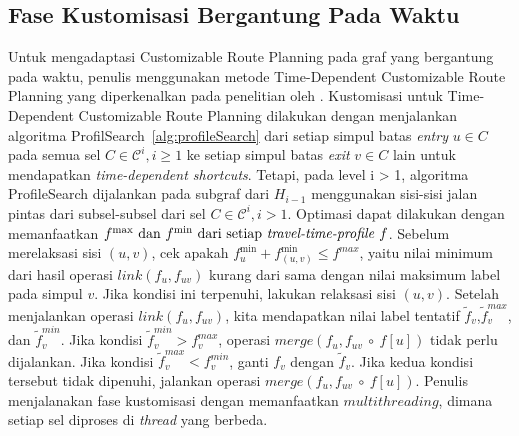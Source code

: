 \subsection{Fase Kustomisasi Bergantung Pada Waktu}
\label{subsec:tdcrp-timedependent-customization}
Untuk mengadaptasi Customizable Route Planning pada graf yang bergantung pada waktu, penulis menggunakan metode Time-Dependent Customizable Route Planning yang diperkenalkan pada penelitian oleh \cite{Baum2016}. Kustomisasi untuk Time-Dependent Customizable Route Planning dilakukan dengan menjalankan algoritma ProfilSearch~\ref{alg:profileSearch} dari setiap simpul batas \textit{entry} $u\in C$ pada semua sel $C\in\mathcal{C}^{i}, i\geq 1$ ke setiap simpul batas \textit{exit} $v\in C$ lain untuk mendapatkan \textit{time-dependent shortcuts}.  Tetapi, pada level i > 1, algoritma ProfileSearch dijalankan pada subgraf dari $H_{i-1}$ menggunakan sisi-sisi jalan pintas dari subsel-subsel dari sel $C\in\mathcal{C}^i, i>1$. Optimasi dapat dilakukan dengan memanfaatkan $f^{\max}\text{ dan }f^{\min} \text{ dari setiap \textit{travel-time-profile} } f $. Sebelum merelaksasi sisi $(u,v)$, cek apakah $f_{u}^{\min}+f_{(u,v)}^{\min}\leq f^{max}$, yaitu nilai minimum dari hasil operasi $link(f_u,f_{uv})$ kurang dari sama dengan nilai maksimum label pada simpul $v$. Jika kondisi ini terpenuhi, lakukan relaksasi sisi $(u,v)$. Setelah menjalankan operasi $link(f_u,f_{uv})$, kita mendapatkan nilai label tentatif $\tilde{f}_v$,$\tilde{f}_v^{max}$, dan $\tilde{f}_v^{min}$. Jika kondisi $\tilde{f}_v^{min}>f_v^{max}$, operasi $merge(f_u,f_{uv}\ \circ \ f[u])$ tidak perlu dijalankan. Jika kondisi $\tilde{f}_v^{max}<f_v^{min}$, ganti $f_v$ dengan $\tilde{f}_v$. Jika kedua kondisi tersebut tidak dipenuhi, jalankan operasi $merge(f_u,f_{uv}\ \circ \ f[u])$. Penulis menjalanakan fase kustomisasi dengan memanfaatkan $multithreading$, dimana setiap sel diproses di \textit{thread} yang berbeda.


